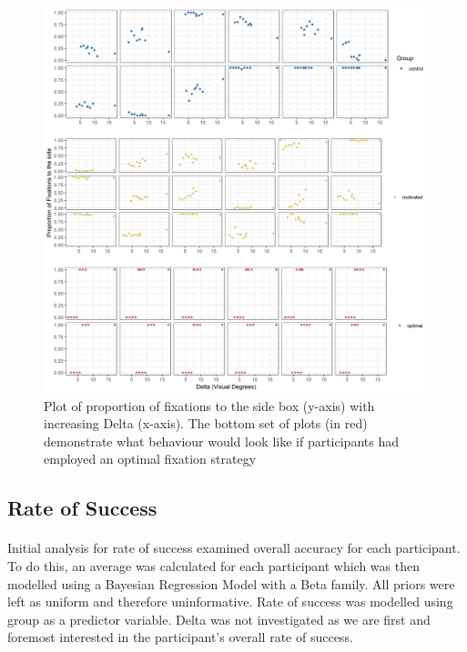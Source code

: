 \documentclass[12pt]{article}
\begin{document}
\begin{figure}[ht!]
	\includegraphics[scale=0.7]{../Figures/Part_2_all_groups.png}
	\centering
	\captionsetup{justification=centering}
	\caption{Plot of proportion of fixations to the side box (y-axis) with increasing Delta (x-axis). The bottom set of plots (in red) demonstrate what behaviour would look like if participants had employed an optimal fixation strategy}
	\label{fig:Position_raw}
\end{figure}

\subsection*{Rate of Success} 
\paragraph{} Initial analysis for rate of success examined overall accuracy for each participant. To do this, an average was calculated for each participant which was then modelled using a Bayesian Regression Model with a Beta family. All priors were left as uniform and therefore uninformative. Rate of success was modelled using group as a predictor variable. Delta was not investigated as we are first and foremost interested in the participant's overall rate of success. 
\end{document}
